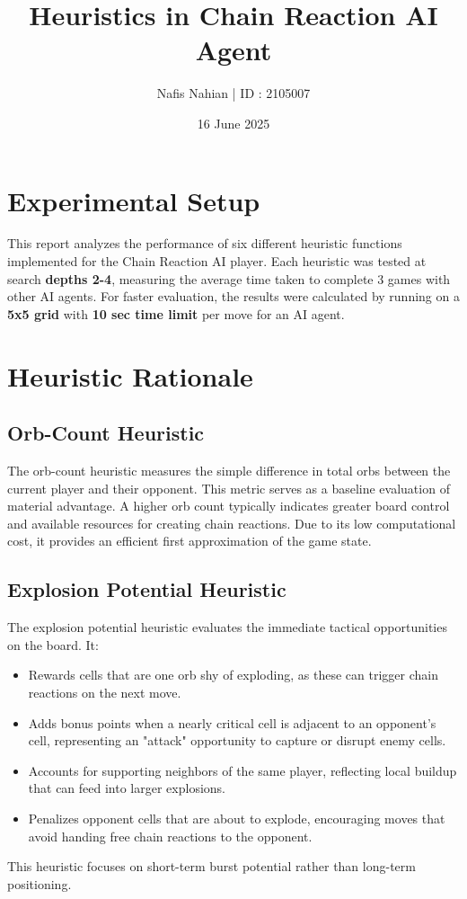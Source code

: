 \documentclass[12pt]{article}
\title{Heuristics in Chain Reaction AI Agent}
\author{Nafis Nahian | ID : 2105007}
\date{16 June 2025}
\begin{document}
\maketitle
\vspace{1em}

\section{Experimental Setup}

This report analyzes the performance of six different heuristic functions implemented for the
 Chain Reaction AI player. Each heuristic was tested at search \textbf{depths 2-4}, measuring the average
 time taken to complete 3 games with other AI agents. For faster evaluation, the results were calculated by running
 on a \textbf{5x5 grid} with \textbf{10 sec time limit} per move for an AI agent. 

\section{Heuristic Rationale}

\subsection{Orb-Count Heuristic}
The orb-count heuristic measures the simple difference in total orbs between the current player and their opponent. This metric serves as a baseline evaluation of material advantage. A higher orb count typically indicates greater board control and available resources for creating chain reactions. Due to its low computational cost, it provides an efficient first approximation of the game state.

\subsection{Explosion Potential Heuristic}
The explosion potential heuristic evaluates the immediate tactical opportunities on the board. It:
\begin{itemize}
  \item Rewards cells that are one orb shy of exploding, as these can trigger chain reactions on the next move.
  \item Adds bonus points when a nearly critical cell is adjacent to an opponent's cell, representing an "attack" opportunity to capture or disrupt enemy cells.
  \item Accounts for supporting neighbors of the same player, reflecting local buildup that can feed into larger explosions.
  \item Penalizes opponent cells that are about to explode, encouraging moves that avoid handing free chain reactions to the opponent.
\end{itemize}
This heuristic focuses on short-term burst potential rather than long-term positioning.
\end{document}
